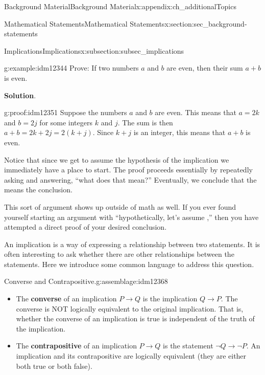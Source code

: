 \documentclass[oneside,10pt,]{book}
\newcommand{\terminology}[1]{\textbf{#1}}
\numberwithin{equation}{chapter}
\def\imp{\rightarrow}
\begin{document}
\begin{appendixptx}{Background Material}{}{Background Material}{}{}{x:appendix:ch_additionalTopics}
\begin{sectionptx}{Mathematical Statements}{}{Mathematical Statements}{}{}{x:section:sec_background-statements}
\begin{subsectionptx}{Implications}{}{Implications}{}{}{x:subsection:subsec_implications}
\begin{example}{}{g:example:idm12344}%
Prove: If two numbers \(a\) and \(b\) are even, then their sum \(a+b\) is even.%
\par\smallskip%
\noindent\textbf{Solution}.\hypertarget{g:solution:idm12350}{}\quad{}\begin{proofptx}{}{g:proof:idm12351}
Suppose the numbers \(a\) and \(b\) are even. This means that  \(a = 2k\) and \(b=2j\) for some integers \(k\) and \(j\). The sum is then \(a+b = 2k+2j = 2(k+j)\). Since \(k+j\) is an integer, this means that \(a+b\) is even.%
\end{proofptx}
Notice that since we get to assume the hypothesis of the implication we immediately have a place to start. The proof proceeds essentially by repeatedly asking and answering, ``what does that mean?''  Eventually, we conclude that the means the conclusion.%
\end{example}
This sort of argument shows up outside of math as well. If you ever found yourself starting an argument with ``hypothetically, let's assume \textellipsis{},'' then you have attempted a direct proof of your desired conclusion.%
\par
An implication is a way of expressing a relationship between two statements.  It is often interesting to ask whether there are other relationships between the statements.  Here we introduce some common language to address this question.%
\begin{assemblage}{Converse and Contrapositive.}{g:assemblage:idm12368}%
%
\begin{itemize}[label=\textbullet]
\item{}The \terminology{converse}  of an implication \(P \imp Q\) is the implication \(Q \imp P\). The converse is NOT logically equivalent to the original implication.  That is, whether the converse of an implication is true is independent of the truth of the implication.%
\item{}The \terminology{contrapositive}  of an implication \(P \imp Q\) is the statement \(\neg Q \imp \neg P\). An implication and its contrapositive are logically equivalent (they are either both true or both false).%
\end{itemize}
%
\end{assemblage}

\end{subsectionptx}
\end{sectionptx}
\end{appendixptx}
\end{document}
